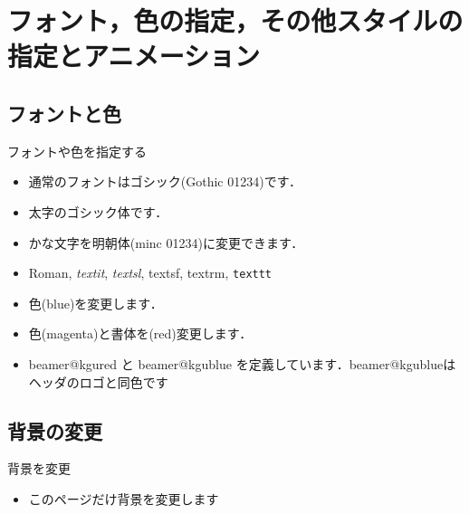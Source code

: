\section{フォント，色の指定，その他スタイルの指定とアニメーション}

\subsection{フォントと色}

\begin{frame}{フォントや色を指定する}
  \begin{itemize}
    \item 通常のフォントはゴシック(Gothic 01234)です．
    \item {\bgoth 太字のゴシック体です．}
    \item {\minc かな文字を明朝体(minc 01234)に変更できます．}
    \item {\rm Roman}, \textit{textit}, \textsl{textsl}, \textsf{textsf}, \textrm{textrm}, \texttt{texttt}
    \item {\color{blue}色(blue)を変更します．}
    \item {\color{magenta}\bgoth 色(magenta)と書体を}{\color{red}\bgoth (red)変更します．}
    \item {\color{beamer@kgured}\bgoth beamer@kgured} と {\color{beamer@kgublue}\bgoth beamer@kgublue} を定義しています．{\color{beamer@kgublue}\bgoth beamer@kgublueはヘッダのロゴと同色です}
  \end{itemize}
\end{frame}

\subsection{背景の変更}
{
\begin{frame}{背景を変更}
  \begin{itemize}
    \item このページだけ背景を変更します
  \end{itemize}
\end{frame}
}

